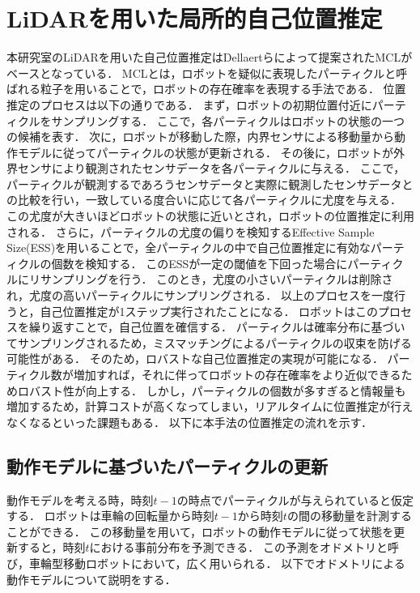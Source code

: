 \section{LiDARを用いた局所的自己位置推定}
本研究室のLiDARを用いた自己位置推定はDellaertらによって提案されたMCL\cite{mcl}がベースとなっている．
MCLとは，ロボットを疑似に表現したパーティクルと呼ばれる粒子を用いることで，ロボットの存在確率を表現する手法である．
位置推定のプロセスは以下の通りである．
まず，ロボットの初期位置付近にパーティクルをサンプリングする．
ここで，各パーティクルはロボットの状態の一つの候補を表す．
次に，ロボットが移動した際，内界センサによる移動量から動作モデルに従ってパーティクルの状態が更新される．
その後に，ロボットが外界センサにより観測されたセンサデータを各パーティクルに与える．
ここで，パーティクルが観測するであろうセンサデータと実際に観測したセンサデータとの比較を行い，一致している度合いに応じて各パーティクルに尤度を与える．
この尤度が大きいほどロボットの状態に近いとされ，ロボットの位置推定に利用される．
さらに，パーティクルの尤度の偏りを検知するEffective Sample Size(ESS)\cite{ess}を用いることで，全パーティクルの中で自己位置推定に有効なパーティクルの個数を検知する．
このESSが一定の閾値を下回った場合にパーティクルにリサンプリングを行う．
このとき，尤度の小さいパーティクルは削除され，尤度の高いパーティクルにサンプリングされる．
以上のプロセスを一度行うと，自己位置推定が1ステップ実行されたことになる．
ロボットはこのプロセスを繰り返すことで，自己位置を確信する．
パーティクルは確率分布に基づいてサンプリングされるため，ミスマッチングによるパーティクルの収束を防げる可能性がある．
そのため，ロバストな自己位置推定の実現が可能になる．
パーティクル数が増加すれば，それに伴ってロボットの存在確率をより近似できるためロバスト性が向上する．
しかし，パーティクルの個数が多すぎると情報量も増加するため，計算コストが高くなってしまい，リアルタイムに位置推定が行えなくなるといった課題もある．
以下に本手法の位置推定の流れを示す．

\subsection{動作モデルに基づいたパーティクルの更新}
動作モデルを考える時，時刻$\displaystyle t-1$の時点でパーティクルが与えられていると仮定する．
ロボットは車輪の回転量から時刻$\displaystyle t-1$から時刻$\displaystyle t$の間の移動量を計測することができる．
この移動量を用いて，ロボットの動作モデルに従って状態を更新すると，時刻$\displaystyle t$における事前分布を予測できる．
この予測をオドメトリと呼び，車輪型移動ロボットにおいて，広く用いられる\cite{fox2005probabilistic}．
以下でオドメトリによる動作モデルについて説明をする．

